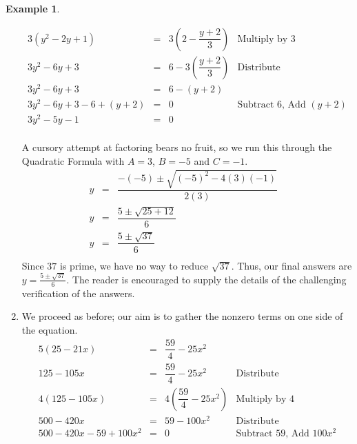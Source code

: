 \documentclass[11pt]{article}
\theoremstyle{definition}  %
\newtheorem{ex}{\bf Example}
\begin{document}
\begin{ex}
\begin{enumerate}
\[\begin{array}{rclr}
3(y^2 - 2y + 1) & = & 3\left(2 - \dfrac{y+2}{3} \right) & \text{Multiply by $3$} \\ [10pt]
3y^2 - 6y + 3 & = & 6 - 3\left(\dfrac{y+2}{3}\right) & \text{Distribute} \\ [8pt]

3y^2 - 6y + 3 & = & 6 - (y+2) & \\

3y^2 - 6y + 3 - 6 + (y+2) & = & 0 & \text{Subtract $6$, Add $(y+2)$}\\

3y^2 - 5y - 1 & = & 0 & \\

\end{array}\]

A cursory attempt at factoring bears no fruit, so we run this through the Quadratic Formula with $A = 3$, $B = -5$ and $C = -1$. \[ \begin{array}{rclr}

y & = & \dfrac{-(-5) \pm \sqrt{(-5)^2 - 4(3)(-1)}}{2(3)} & \\ [8pt]

y & = & \dfrac{5 \pm \sqrt{25 + 12}}{6} & \\[8pt]

y & = & \dfrac{5 \pm \sqrt{37}}{6} & \\

\end{array} \] Since $37$ is prime, we have no way to reduce $\sqrt{37}$.  Thus, our final answers are $y = \frac{5 \pm \sqrt{37}}{6}$. The reader is encouraged to supply the details of the challenging verification of the answers.

\item  We proceed as before; our aim is to gather the nonzero terms on one side of the equation. \[ \begin{array}{rclr}

5(25 - 21x) & = &  \dfrac{59}{4} - 25x^2 & \\ [10pt]

125 - 105x & = & \dfrac{59}{4} - 25x^2 & \text{Distribute} \\ [10pt]

4(125 - 105x) & = & 4\left(\dfrac{59}{4} - 25x^2 \right) & \text{Multiply by $4$} \\ [10pt]

500 - 420x & = & 59 - 100x^2 & \text{Distribute} \\ [10pt]

500 - 420x - 59 + 100x^2 & = & 0 & \text{Subtract $59$, Add $100x^2$} \\ [10pt]


\end{array}\]
\end{enumerate}
\end{ex}
\end{document}
